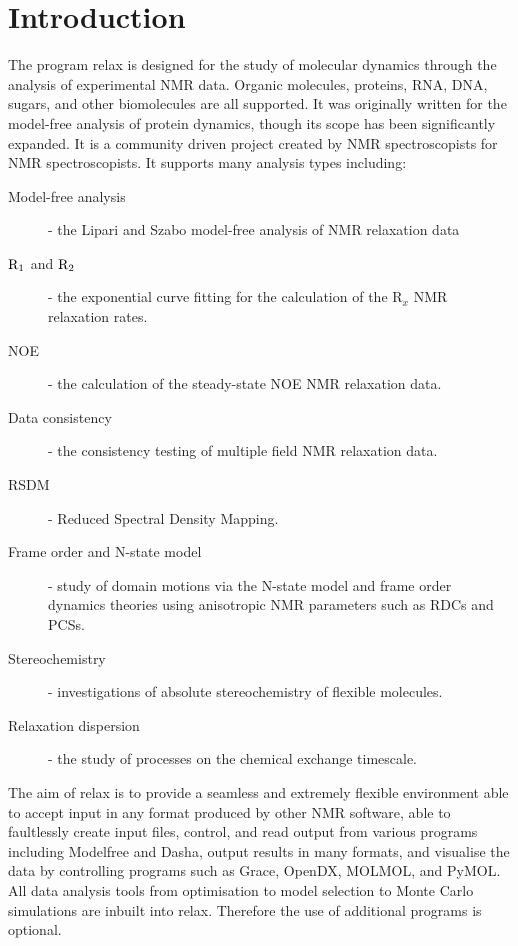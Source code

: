 
\chapter{Introduction}

The program relax is designed for the study of molecular dynamics through the analysis of experimental NMR data.
Organic molecules, proteins, RNA, DNA, sugars, and other biomolecules are all supported.
It was originally written for the model-free analysis of protein dynamics, though its scope has been significantly expanded.
It is a community driven project created by NMR spectroscopists for NMR spectroscopists.
It supports many analysis types including:

\begin{description}
\item[Model-free analysis] - the Lipari and Szabo model-free analysis of NMR relaxation data
\item[$\mathrm{R}_1$ and $\mathrm{R}_2$] - the exponential curve fitting for the calculation of the R$_x$ NMR relaxation rates.
\item[NOE] - the calculation of the steady-state NOE NMR relaxation data.
\item[Data consistency] - the consistency testing of multiple field NMR relaxation data.
\item[RSDM] - Reduced Spectral Density Mapping.
\item[Frame order and N-state model] - study of domain motions via the N-state model and frame order dynamics theories using anisotropic NMR parameters such as RDCs and PCSs.
\item[Stereochemistry] - investigations of absolute stereochemistry of flexible molecules.
\item[Relaxation dispersion] - the study of processes on the chemical exchange timescale.
\end{description}

The aim of relax is to provide a seamless and extremely flexible environment able to accept input in any format produced by other NMR software, able to faultlessly create input files, control, and read output from various programs including Modelfree and Dasha, output results in many formats, and visualise the data by controlling programs such as Grace, OpenDX, MOLMOL, and PyMOL.
All data analysis tools from optimisation to model selection to Monte Carlo simulations are inbuilt into relax.
Therefore the use of additional programs is optional.

